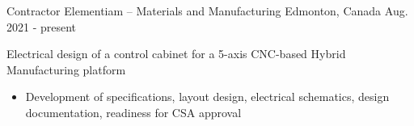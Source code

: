 

\begin{cventries}


  \cventry
    {Contractor} %
    {Elementiam -- Materials and Manufacturing} %
    {Edmonton, Canada} %
    {Aug. 2021 - present} %
    {
      \begin{cvitems}
        \item Electrical design of a control cabinet for a 5-axis CNC-based Hybrid Manufacturing platform
        \begin{itemize}
          \item Development of specifications, layout design, electrical schematics, design documentation, readiness for CSA approval
        \end{itemize}
      \end{cvitems}
    }


\end{cventries}
